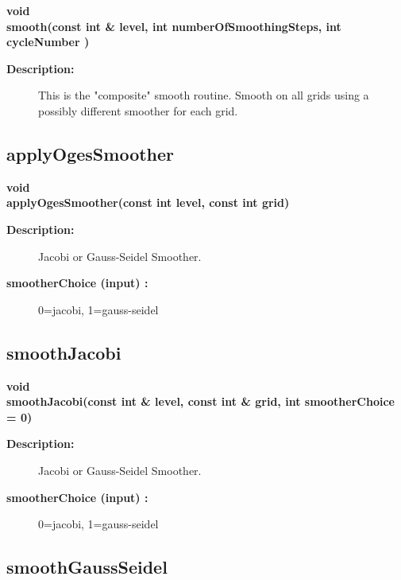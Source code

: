\begin{flushleft} \textbf{%
void  \\ 
\settowidth{\OgmgIncludeArgIndent}{smooth(}%
smooth(const int \& level, int numberOfSmoothingSteps, int cycleNumber )
}\end{flushleft}
\begin{description}
\item[{\bf Description:}] 
     This is the "composite" smooth routine. Smooth on all grids using a possibly different
  smoother for each grid.
\end{description}
\subsection{applyOgesSmoother}
 
\begin{flushleft} \textbf{%
void      \\ 
\settowidth{\OgmgIncludeArgIndent}{applyOgesSmoother(}%
applyOgesSmoother(const int level, const int grid)
}\end{flushleft}
\begin{description}
\item[{\bf Description:}] 
    Jacobi or Gauss-Seidel Smoother.

\item[{\bf smootherChoice (input) :}]  0=jacobi, 1=gauss-seidel
\end{description}
\subsection{smoothJacobi}
 
\begin{flushleft} \textbf{%
void  \\ 
\settowidth{\OgmgIncludeArgIndent}{smoothJacobi(}%
smoothJacobi(const int \& level, const int \& grid, int smootherChoice  = 0)
}\end{flushleft}
\begin{description}
\item[{\bf Description:}] 
    Jacobi or Gauss-Seidel Smoother.

\item[{\bf smootherChoice (input) :}]  0=jacobi, 1=gauss-seidel
\end{description}
\subsection{smoothGaussSeidel}
 
